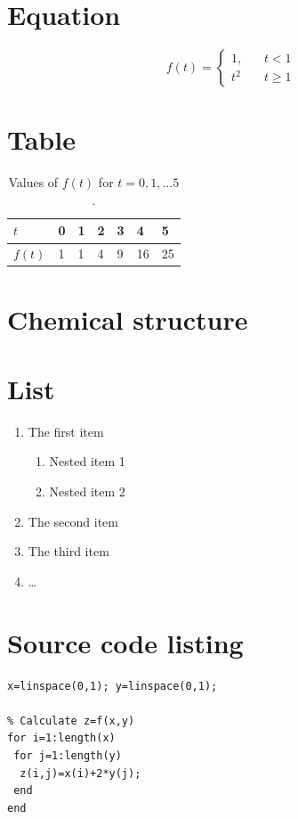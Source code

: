 \section{Equation}
\begin{equation}
f(t)=\left\{ \begin{array}{ll}
1,~~~~ & t< 1 \\
t^2 & t\geq 1
\end{array}\right.
\end{equation}

\section{Table}
\begin{table}[H]
\centering
\caption{Values of $f(t)$ for $t=0,1,\dots 5$.}
\begin{tabular}{l|llllll} \hline\hline
$t$ & 0 & 1 & 2 & 3 & 4 & 5 \\ \hline
$f(t)$ & 1 & 1 & 4 & 9 & 16 & 25 \\ \hline\hline
\end{tabular}
\end{table}

\section{Chemical structure}
\begin{center}
\end{center}

\section{List}
\begin{enumerate}
  \item The first item
  \begin{enumerate}
    \item Nested item 1
    \item Nested item 2
  \end{enumerate}
  \item The second item
  \item The third item 
  \item \dots
\end{enumerate}

\section{Source code listing}
\begin{lstlisting}[frame=single]
% Generate x- and y-nodes
x=linspace(0,1); y=linspace(0,1);

% Calculate z=f(x,y)
for i=1:length(x)
 for j=1:length(y)
  z(i,j)=x(i)+2*y(j);
 end
end
\end{lstlisting}


